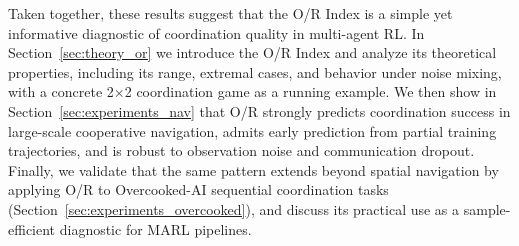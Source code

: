 

Taken together, these results suggest that the O/R Index is a simple yet
informative diagnostic of coordination quality in multi-agent RL. In
Section~\ref{sec:theory_or} we introduce the O/R Index and analyze its
theoretical properties, including its range, extremal cases, and behavior
under noise mixing, with a concrete 2$\times$2 coordination game as a
running example. We then show in Section~\ref{sec:experiments_nav} that
O/R strongly predicts coordination success in large-scale cooperative
navigation, admits early prediction from partial training trajectories,
and is robust to observation noise and communication dropout. Finally,
we validate that the same pattern extends beyond spatial navigation by
applying O/R to Overcooked-AI sequential coordination tasks
(Section~\ref{sec:experiments_overcooked}), and discuss its practical use
as a sample-efficient diagnostic for MARL pipelines.







